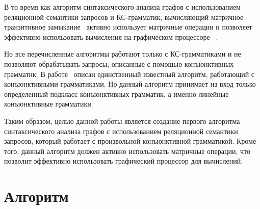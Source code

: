 \documentclass [a4paper] {article}
\begin{document}
	В то время как алгоритм синтаксического анализа графов с использованием реляционной семантики запросов и КС-грамматик, вычисляющий матричное транзитивное замыкание~\cite{azimov2018context} активно использует матричные операции и позволяет эффективно использовать вычисления на графическом процессоре ~\cite{matricesOnGPGPU}.
	
	Но все перечисленные алгоритмы работают только с КС-грамматиками и не позволяют обрабатывать запросы, описанные с помощью конъюнктивных грамматик. В работе~\cite{zhang2017context} описан единственный известный алгоритм, работающий с конъюнктивными грамматиками. Но данный алгоритм принимает на вход только определенный подкласс конъюнктивных грамматик, а именно линейные конъюнктивные грамматики.
	
	Таким образом, целью данной работы является создание первого алгоритма синтаксического анализа графов с использованием реляционной семантики запросов, который работает с произвольной конъюнктивной грамматикой. Кроме того, данный алгоритм должен активно использовать матричные операции, что позволит эффективно использовать графический процессор для вычислений.

	
	\section{Алгоритм}
	
	
	
	
\end{document}
